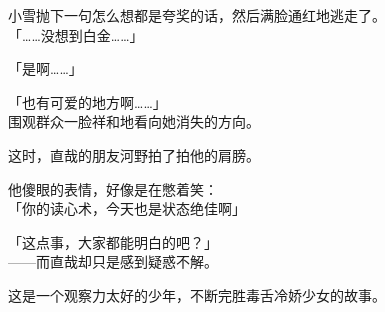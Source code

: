 小雪抛下一句怎么想都是夸奖的话，然后满脸通红地逃走了。\\

「……没想到白金……」

「是啊……」

「也有可爱的地方啊……」\\

围观群众一脸祥和地看向她消失的方向。

这时，直哉的朋友河野拍了拍他的肩膀。

他傻眼的表情，好像是在憋着笑：\\

「你的读心术，今天也是状态绝佳啊」

「这点事，大家都能明白的吧？」\\

——而直哉却只是感到疑惑不解。\\

\vspace{2\baselineskip}

这是一个观察力太好的少年，不断完胜毒舌冷娇少女的故事。
